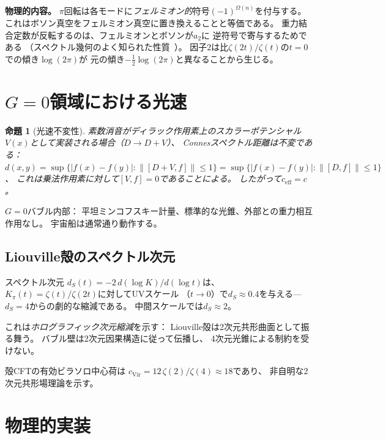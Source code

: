 \documentclass[a4paper,11pt]{article}
\newtheorem{proposition}[theorem]{命題}
\begin{document}
\textbf{物理的内容。}
$\pi$回転は各モードに\emph{フェルミオン的}符号$(-1)^{\Omega(n)}$を付与する。
これはボソン真空をフェルミオン真空に置き換えることと等価である。
重力結合定数が反転するのは、フェルミオンとボソンが$a_2$に
逆符号で寄与するためである
（スペクトル幾何のよく知られた性質~\cite{Gilkey1995}）。
因子2は比$\zeta(2t)/\zeta(t)$の$t = 0$での傾き$\log(2\pi)$が
元の傾き$-\tfrac{1}{2}\log(2\pi)$と異なることから生じる。

\section{$G = 0$領域における光速}
\label{sec:light}

\begin{proposition}[光速不変性]
素数消音がディラック作用素上のスカラーポテンシャル
$V(x)$として実装される場合（$D \to D + V$）、
Connesスペクトル距離は不変である：
$d(x,y) = \sup\{|f(x) - f(y)| : \|[D+V, f]\| \leq 1\}
= \sup\{|f(x) - f(y)| : \|[D, f]\| \leq 1\}$、
これは乗法作用素に対して$[V, f] = 0$であることによる。
したがって$c_{\mathrm{eff}} = c$。
\end{proposition}

$G = 0$バブル内部：
平坦ミンコフスキー計量、標準的な光錐、外部との重力相互作用なし。
宇宙船は通常通り動作する。

\subsection{Liouville殻のスペクトル次元}

スペクトル次元
$d_S(t) = -2\,d(\log K)/d(\log t)$は、
$K_\pi(t) = \zeta(t)/\zeta(2t)$に対してUVスケール
（$t \to 0$）で$d_S \approx 0.4$を与える---$d_S = 4$からの劇的な縮減である。
中間スケールでは$d_S \approx 2$。

これは\emph{ホログラフィック次元縮減}を示す：
Liouville殻は2次元共形曲面として振る舞う。
バブル壁は2次元因果構造に従って伝播し、
4次元光錐による制約を受けない。

殻CFTの有効ビラソロ中心荷は
$c_{\mathrm{Vir}} = 12\,\zeta(2)/\zeta(4) \approx 18$であり、
非自明な2次元共形場理論を示す。

\section{物理的実装}
\label{sec:implementation}
\end{document}
